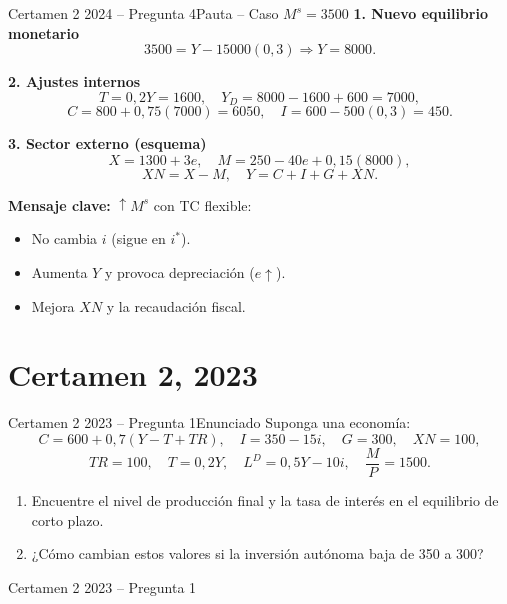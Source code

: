 \documentclass[aspectratio=169]{beamer}
\begin{document}
\begin{frame}{Certamen 2 2024 -- Pregunta 4}{Pauta -- Caso $M^s=3500$}
\small
\textbf{1. Nuevo equilibrio monetario}
\[
3500 = Y - 15000(0{,}3) \Rightarrow Y = 8000.
\]

\textbf{2. Ajustes internos}
\[
T = 0{,}2Y = 1600,\quad
Y_D = 8000 - 1600 + 600 = 7000,
\]
\[
C = 800 + 0{,}75(7000) = 6050,\quad
I = 600 - 500(0{,}3) = 450.
\]

\textbf{3. Sector externo (esquema)}
\[
X = 1300 + 3e,\quad
M = 250 - 40e + 0{,}15(8000),
\]
\[
XN = X - M,\quad
Y = C + I + G + XN.
\]

\textbf{Mensaje clave:} $\uparrow M^s$ con TC flexible:
\begin{itemize}
  \item No cambia $i$ (sigue en $i^*$).
  \item Aumenta $Y$ y provoca depreciación ($e \uparrow$).
  \item Mejora $XN$ y la recaudación fiscal.
\end{itemize}
\end{frame}


\section{Certamen 2, 2023}

\begin{frame}{Certamen 2 2023 -- Pregunta 1}{Enunciado}
\small
Suponga una economía:
\[
C = 600 + 0{,}7(Y - T + TR),\quad
I = 350 - 15i,\quad
G = 300,\quad
XN = 100,
\]
\[
TR = 100,\quad
T = 0{,}2Y,\quad
L^D = 0{,}5Y - 10i,\quad
\frac{M}{P} = 1500.
\]

\begin{enumerate}[label=\alph*)]
  \item Encuentre el nivel de producción final y la tasa de interés en el equilibrio de corto plazo.
  \item ¿Cómo cambian estos valores si la inversión autónoma baja de 350 a 300?
\end{enumerate}
\end{frame}

\begin{frame}{Certamen 2 2023 -- Pregunta 1}
  \vfill
  \centering
  \vfill
\end{frame}
\end{document}
